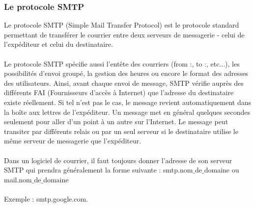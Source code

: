 \documentclass[french]{report}
\begin{document}
\subsubsection{\LARGE Le protocole SMTP }
\LARGE Le protocole SMTP (Simple Mail Transfer Protocol) est le protocole standard permettant de transférer le courrier entre deux serveurs de messagerie - celui de l'expéditeur et celui du destinataire.\\ \\
Le protocole SMTP spécifie aussi l'entête des courriers (from :, to :, etc...), les possibilités d'envoi groupé, la gestion des heures ou encore le format des adresses des utilisateurs. Ainsi, avant chaque envoi de message, SMTP vérifie auprès des différents FAI (Fournisseurs d'accès à Internet) que l'adresse du destinataire existe réellement. Si tel n'est pas le cas, le message revient automatiquement dans la boîte aux lettres de l'expéditeur.
Un message met en général quelques secondes seulement pour aller d'un point à un autre sur l'Internet. Le message peut transiter par différents relais ou par un seul serveur si le destinataire utilise le même serveur de messagerie que l'expéditeur.\\ \\
Dans un logiciel de courrier, il faut toujours donner l'adresse de son serveur SMTP qui prendra généralement la forme suivante : smtp.nom$\_$de$\_$domaine ou mail.nom$\_$de$\_$domaine\\ \\
Exemple : smtp.google.com.
\end{document}
